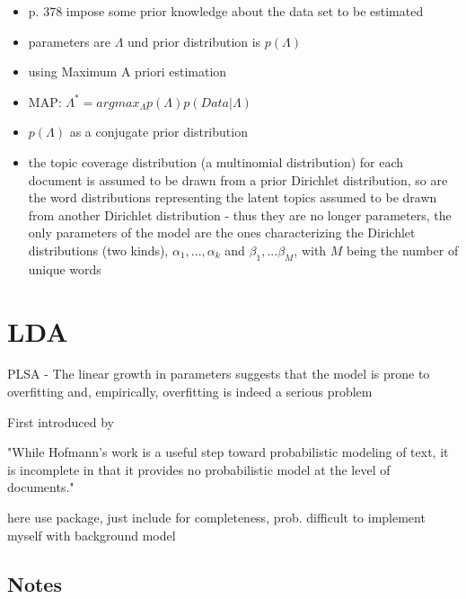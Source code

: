 \documentclass[11pt,a4paper,english,oneside]{book}
\numberwithin{equation}{chapter}
\begin{document}
\begin{itemize}
	\item p. 378 impose some prior knowledge about the data set to be estimated
	\item parameters are $\Lambda$ und prior distribution is $p(\Lambda)$
	\item using Maximum A priori estimation
	\item MAP: $\Lambda^* = arg max_{\Lambda}p(\Lambda)p(Data|\Lambda)$
	\item $p(\Lambda)$ as a conjugate prior distribution
	\item the topic coverage distribution (a multinomial distribution) for each document is assumed to be drawn from a prior Dirichlet distribution, so are the word distributions representing the latent topics assumed to be drawn from another Dirichlet distribution - thus they are no longer parameters, the only parameters of the model are the ones characterizing the Dirichlet distributions (two kinds), $\alpha_1, ... , \alpha_k$ and $\beta_1, ... \beta_M$, with $M$ being the number of unique words
\end{itemize}



\section{LDA}

PLSA - The linear growth in parameters suggests that the model is prone to overfitting and, empirically, overfitting is indeed a serious problem \cite[p. 1001]{Blei.2003}

First introduced by \cite{Blei.2003}

"While Hofmann’s work is a useful step toward probabilistic modeling of text, it is incomplete in that it provides no probabilistic model at the level of documents." \cite[p. 994]{Blei.2003}


here use package, just include for completeness, prob. difficult to implement myself with background model




\subsection{Notes}
\end{document}
